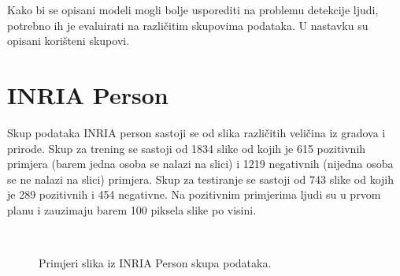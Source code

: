 Kako bi se opisani modeli mogli bolje usporediti na problemu detekcije ljudi, potrebno ih je evaluirati na različitim skupovima podataka. U nastavku su opisani korišteni skupovi.

\section{INRIA Person}
Skup podataka INRIA person sastoji se od slika različitih veličina iz gradova i prirode. Skup za trening se sastoji od 1834 slike od kojih je 615 pozitivnih primjera (barem jedna osoba se nalazi na slici) i 1219 negativnih (nijedna osoba se ne nalazi na slici) primjera. Skup za testiranje se sastoji od 743 slike od kojih je 289 pozitivnih i 454 negativne.
Na pozitivnim primjerima ljudi su u prvom planu i zauzimaju barem 100 piksela slike po visini.

\begin{figure}[h]
 \
 \
\caption{Primjeri slika iz INRIA Person skupa podataka.}
\end{figure}

